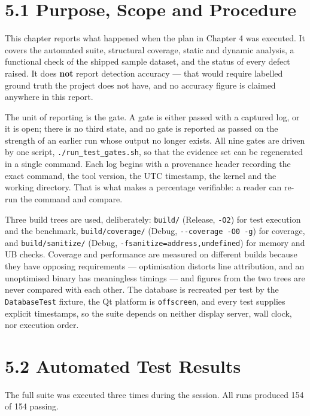 \documentclass[
  12pt,
]{report}
\begin{document}
\section{5.1 Purpose, Scope and
Procedure}\label{purpose-scope-and-procedure}

This chapter reports what happened when the plan in Chapter 4 was
executed. It covers the automated suite, structural coverage, static and
dynamic analysis, a functional check of the shipped sample dataset, and
the status of every defect raised. It does \textbf{not} report detection
accuracy --- that would require labelled ground truth the project does
not have, and no accuracy figure is claimed anywhere in this report.

The unit of reporting is the gate. A gate is either passed with a
captured log, or it is open; there is no third state, and no gate is
reported as passed on the strength of an earlier run whose output no
longer exists. All nine gates are driven by one script,
\texttt{./\allowbreak{}run\_test\_gates.sh}, so that the evidence set can be
regenerated in a single command. Each log begins with a provenance
header recording the exact command, the tool version, the UTC timestamp,
the kernel and the working directory. That is what makes a percentage
verifiable: a reader can re-run the command and compare.

Three build trees are used, deliberately: \texttt{build/\allowbreak{}} (Release,
\texttt{-O2}) for test execution and the benchmark,
\texttt{build/\allowbreak{}coverage/\allowbreak{}} (Debug, \texttt{-\/\allowbreak{}-coverage\ -O0\ -g}) for
coverage, and \texttt{build/\allowbreak{}sanitize/\allowbreak{}} (Debug,
\texttt{-fsanitize=address,undefined}) for memory and UB checks.
Coverage and performance are measured on different builds because they
have opposing requirements --- optimisation distorts line attribution,
and an unoptimised binary has meaningless timings --- and figures from
the two trees are never compared with each other. The database is
recreated per test by the \texttt{DatabaseTest} fixture, the Qt platform
is \texttt{offscreen}, and every test supplies explicit timestamps, so
the suite depends on neither display server, wall clock, nor execution
order.

\section{5.2 Automated Test Results}\label{automated-test-results}

The full suite was executed three times during the session. All runs
produced 154 of 154 passing.
\end{document}
